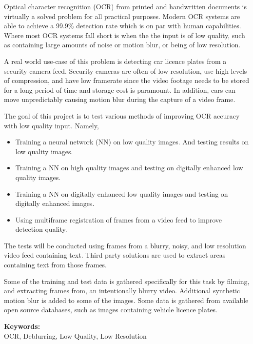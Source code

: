 \documentclass[12pt]{article}
\begin{document}
Optical character recognition (OCR) from printed and handwritten documents is virtually a solved problem for all practical purposes. Modern OCR systems are able to achieve a 99.9\% detection rate which is on par with human capabilities. Where most OCR systems fall short is when the the input is of low quality, such as containing large amounts of noise or motion blur, or being of low resolution.

A real world use-case of this problem is detecting car licence plates from a security camera feed. Security cameras are often of low resolution, use high levels of compression, and have low framerate since the video footage needs to be stored for a long period of time and storage cost is paramount. In addition, cars can move unpredictably causing motion blur during the capture of a video frame.

The goal of this project is to test various methods of improving OCR accuracy with low quality input. Namely,
\begin{itemize}
  \item Training a neural network (NN) on low quality images. And testing results on low quality images.
  \item Training a NN on high quality images and testing on digitally enhanced low quality images.
  \item Training a NN on digitally enhanced low quality images and testing on digitally enhanced images.
  \item Using multiframe registration of frames from a video feed to improve detection quality.
\end{itemize}

The tests will be conducted using frames from a blurry, noisy, and low resolution video feed containing text. Third party solutions are used to extract areas containing text from those frames.

Some of the training and test data is gathered specifically for this task by filming, and extracting frames from, an intentionally blurry video. Additional synthetic motion blur is added to some of the images. Some data is gathered from available open source databases, such as images containing vehicle licence plates.

\vspace*{1ex}

\noindent\textbf{Keywords:}\\

OCR, Deblurring, Low Quality, Low Resolution

\end{document}
